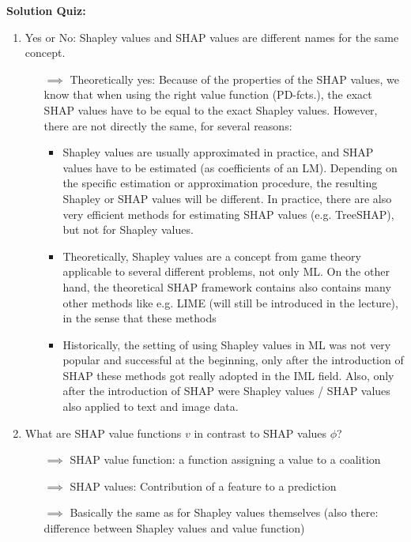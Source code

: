 \textbf{Solution Quiz:}\\\noindent
\medskip

\begin{enumerate}
    \item Yes or No: Shapley values and SHAP values are different names for the same concept.
    \begin{itemize}
    	\item[$\implies$] Theoretically yes: Because of the properties of the SHAP values, we know that when using the right value function (PD-fcts.), the exact SHAP values have to be equal to the exact Shapley values.
        However, there are not directly the same, for several reasons:
        \begin{itemize}
            \item Shapley values are usually approximated in practice, and SHAP values have to be estimated (as coefficients of an LM).
            Depending on the specific estimation or approximation procedure, the resulting Shapley or SHAP values will be different.
            In practice, there are also very efficient methods for estimating SHAP values (e.g. TreeSHAP), but not for Shapley values.
            \item Theoretically, Shapley values are a concept from game theory applicable to several different problems, not only ML.
            On the other hand, the theoretical SHAP framework contains also contains many other methods like e.g. LIME (will still be introduced in the lecture), in the sense that these methods 
            \item
            Historically, the setting of using Shapley values in ML was not very popular and successful at the beginning, only after the introduction of SHAP these methods got really adopted in the IML field.
            Also, only after the introduction of SHAP were Shapley values / SHAP values also applied to text and image data.
        \end{itemize}
    \end{itemize}
    \item What are SHAP value functions $v$ in contrast to SHAP values $\phi$?
    \begin{itemize}
    	\item[$\implies$] SHAP value function: a function assigning a value to a coalition
    	\item[$\implies$] SHAP values: Contribution of a feature to a prediction
        \item[$\implies$] Basically the same as for Shapley values themselves (also there: difference between Shapley values and value function)

\end{itemize}
\end{enumerate}
